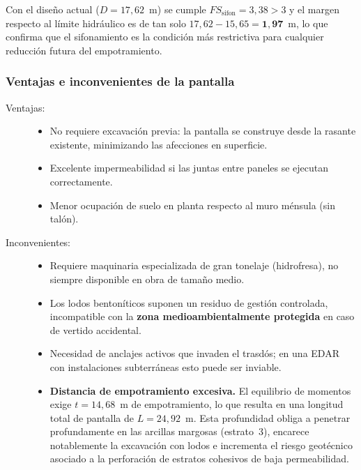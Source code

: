 Con el diseño actual ($D = 17{,}62$~m) se cumple $FS_\text{sifon} = 3{,}38 > 3$
y el margen respecto al límite hidráulico es de tan solo
$17{,}62 - 15{,}65 = \mathbf{1{,}97}$~m, lo que confirma que el sifonamiento
es la condición más restrictiva para cualquier reducción futura del
empotramiento.

\subsubsection{Ventajas e inconvenientes de la pantalla}

\begin{description}
  \item[Ventajas:]
    \begin{itemize}
      \item No requiere excavación previa: la pantalla se construye desde
            la rasante existente, minimizando las afecciones en superficie.
      \item Excelente impermeabilidad si las juntas entre paneles se ejecutan
            correctamente.
      \item Menor ocupación de suelo en planta respecto al muro ménsula
            (sin talón).
    \end{itemize}
  \item[Inconvenientes:]
    \begin{itemize}
      \item Requiere maquinaria especializada de gran tonelaje (hidrofresa), 
            no siempre disponible en obra de tamaño medio.
      \item Los lodos bentoníticos suponen un residuo de gestión controlada,
            incompatible con la \textbf{zona medioambientalmente protegida}
            en caso de vertido accidental.
      \item Necesidad de anclajes activos que invaden el trasdós; en una EDAR
            con instalaciones subterráneas esto puede ser inviable.
      \item \textbf{Distancia de empotramiento excesiva.} El equilibrio de
            momentos exige $t = 14{,}68$~m de empotramiento, lo que resulta
            en una longitud total de pantalla de $L = 24{,}92$~m. Esta
            profundidad obliga a penetrar profundamente en las arcillas
            margosas (estrato~3), encarece notablemente la excavación con
            lodos e incrementa el riesgo geotécnico asociado a la
            perforación de estratos cohesivos de baja permeabilidad.
    \end{itemize}
\end{description}

